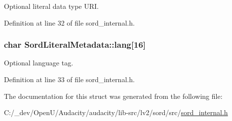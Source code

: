 Optional literal data type U\+RI. 



Definition at line 32 of file sord\+\_\+internal.\+h.

\subsubsection[{\texorpdfstring{lang}{lang}}]{\setlength{\rightskip}{0pt plus 5cm}char Sord\+Literal\+Metadata\+::lang\mbox{[}16\mbox{]}}\hypertarget{struct_sord_literal_metadata_afb8e5cb000235b9949d174f438bab4da}{}\label{struct_sord_literal_metadata_afb8e5cb000235b9949d174f438bab4da}


Optional language tag. 



Definition at line 33 of file sord\+\_\+internal.\+h.



The documentation for this struct was generated from the following file\+:\begin{DoxyCompactItemize}
\item 
C\+:/\+\_\+dev/\+Open\+U/\+Audacity/audacity/lib-\/src/lv2/sord/src/\hyperlink{sord__internal_8h}{sord\+\_\+internal.\+h}\end{DoxyCompactItemize}

